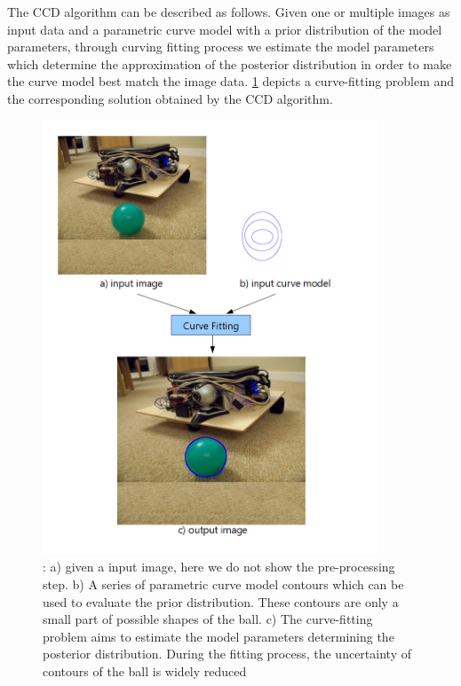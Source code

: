 The CCD algorithm can be described as follows. Given one or multiple images as input
data and a parametric curve model with a prior distribution of the model
parameters, through curving fitting process we estimate the model
parameters which determine the approximation of the posterior
distribution in order to make the curve model best match the image data.
\ref{fig:fitting} depicts a curve-fitting problem and the corresponding solution obtained by the
CCD algorithm.
\begin{figure}[htb]
  \centering
  \includegraphics[width=10cm]{images/fitting.png}
  \caption[The description of curve-fitting problem]{: a) given a input
    image, here we do not show the pre-processing step. b) A series of
    parametric curve model contours which can be used to evaluate the
    prior distribution. These contours are only a small part of
    possible shapes of the ball. c) The curve-fitting problem aims to estimate the model
    parameters determining the posterior distribution. During the
    fitting process, the uncertainty of contours of the ball is widely
    reduced}
  \label{fig:fitting}
\end{figure}




